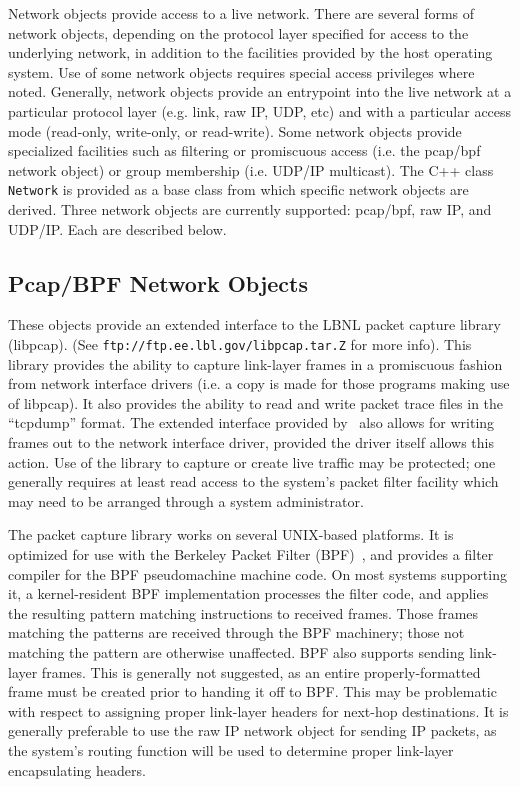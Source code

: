 Network objects provide access to a live network.
There are several forms of network objects, depending on the
protocol layer specified for access to the underlying network,
in addition to the facilities provided by the host operating system.
Use of some network objects requires special access
privileges where noted.
Generally, network objects provide an entrypoint into the live
network at a particular protocol layer (e.g. link, raw IP, UDP, etc)
and with a particular access mode (read-only, write-only, or read-write).
Some network objects provide specialized facilities such as filtering
or promiscuous access (i.e. the pcap/bpf network object)
or group membership (i.e. UDP/IP multicast).
The C++ class {\tt Network} is provided as a base class from
which specific network objects are derived.
Three network objects are currently supported: pcap/bpf, raw IP,
and UDP/IP.
Each are described below.

\subsection{Pcap/BPF Network Objects}

These objects provide an extended interface to the LBNL packet capture
library (libpcap).
(See {\tt ftp://ftp.ee.lbl.gov/libpcap.tar.Z} for more info).
This library provides the ability to capture link-layer frames
in a promiscuous fashion from network interface drivers
(i.e. a copy is made for those programs making use of libpcap).
It also provides the ability to read and write packet trace
files in the ``tcpdump'' format.
The extended interface provided by \ns~also allows for writing
frames out to the network interface driver, provided the driver
itself allows this action.
Use of the library to capture or create live traffic may be protected;
one generally requires at least read access to the system's packet filter
facility which may need to be arranged through a system administrator.

The packet capture library works on several UNIX-based platforms.
It is optimized for use with the
Berkeley Packet Filter (BPF)~\cite{BPF93},
and provides a filter compiler for the BPF pseudomachine machine code.
On most systems supporting it,
a kernel-resident BPF implementation processes the filter code, and 
applies the resulting pattern matching instructions to received frames.
Those frames matching the patterns are received through the BPF machinery;
those not matching the pattern are otherwise unaffected.
BPF also supports sending link-layer frames.
This is generally not suggested, as an entire properly-formatted frame
must be created prior to handing it off to BPF.
This may be problematic with respect to assigning proper link-layer headers
for next-hop destinations.
It is generally preferable to use the raw IP network object for sending
IP packets, as the system's routing function will be used to determine
proper link-layer encapsulating headers.

